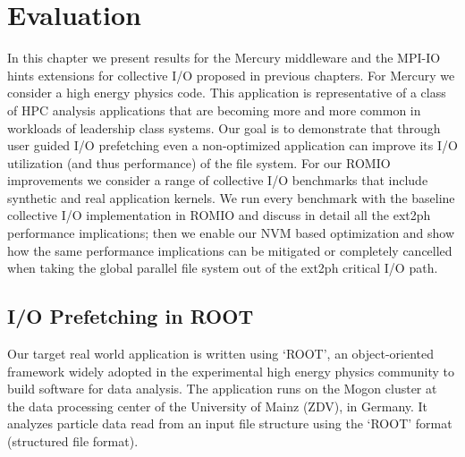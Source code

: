 \chapter{Evaluation} \label{chapt: evaluation}
In this chapter we present results for the Mercury middleware and the MPI-IO hints extensions for collective I/O proposed in previous chapters. For Mercury we consider a high energy physics code.
This application is representative of a class of HPC analysis applications that are becoming more and more common in workloads of leadership class systems. Our goal is to demonstrate that through
user guided I/O prefetching even a non-optimized application can improve its I/O utilization (and thus performance) of the file system.
For our ROMIO improvements we consider a range of collective I/O benchmarks that include synthetic and real application kernels. We run every benchmark with the baseline collective I/O implementation
in ROMIO and discuss in detail all the ext2ph performance implications; then we enable our NVM based optimization and show how the same performance implications can be mitigated or completely
cancelled when taking the global parallel file system out of the ext2ph critical I/O path.

\section{I/O Prefetching in ROOT}
Our target real world application is written using `ROOT', an object-oriented framework widely adopted in the experimental high energy physics community to build software 
for data analysis. The application runs on the Mogon cluster at the data processing center of the University of Mainz (ZDV), in Germany. It analyzes particle data read from 
an input file structure using the `ROOT' format (structured file format).

